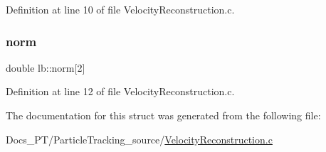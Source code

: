 Definition at line 10 of file Velocity\+Reconstruction.\+c.

\mbox{\label{structlb_a661e852334d1c5f1c8552b1eb2f06db8}} 
\subsubsection{\texorpdfstring{norm}{norm}}
{\footnotesize\ttfamily double lb\+::norm\mbox{[}2\mbox{]}}



Definition at line 12 of file Velocity\+Reconstruction.\+c.



The documentation for this struct was generated from the following file\+:\begin{DoxyCompactItemize}
\item 
Docs\+\_\+\+P\+T/\+Particle\+Tracking\+\_\+source/\mbox{\hyperlink{_velocity_reconstruction_8c}{Velocity\+Reconstruction.\+c}}\end{DoxyCompactItemize}
